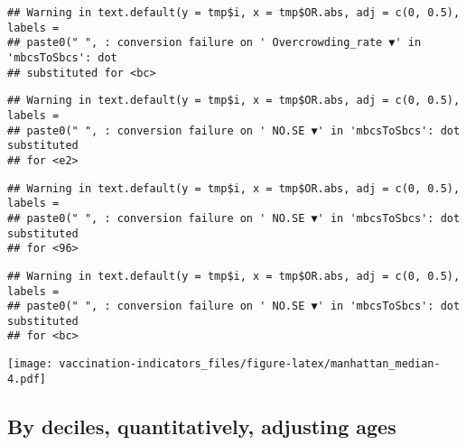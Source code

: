 \documentclass[
]{article}
\begin{document}
\begin{verbatim}
## Warning in text.default(y = tmp$i, x = tmp$OR.abs, adj = c(0, 0.5), labels =
## paste0(" ", : conversion failure on ' Overcrowding_rate ▼' in 'mbcsToSbcs': dot
## substituted for <bc>
\end{verbatim}

\begin{verbatim}
## Warning in text.default(y = tmp$i, x = tmp$OR.abs, adj = c(0, 0.5), labels =
## paste0(" ", : conversion failure on ' NO.SE ▼' in 'mbcsToSbcs': dot substituted
## for <e2>
\end{verbatim}

\begin{verbatim}
## Warning in text.default(y = tmp$i, x = tmp$OR.abs, adj = c(0, 0.5), labels =
## paste0(" ", : conversion failure on ' NO.SE ▼' in 'mbcsToSbcs': dot substituted
## for <96>
\end{verbatim}

\begin{verbatim}
## Warning in text.default(y = tmp$i, x = tmp$OR.abs, adj = c(0, 0.5), labels =
## paste0(" ", : conversion failure on ' NO.SE ▼' in 'mbcsToSbcs': dot substituted
## for <bc>
\end{verbatim}

\texttt{[image: vaccination-indicators\_files/figure-latex/manhattan\_median-4.pdf]}

\hypertarget{by-deciles-quantitatively-adjusting-ages}{%
\subsection{By deciles, quantitatively, adjusting
ages}\label{by-deciles-quantitatively-adjusting-ages}}
\end{document}
